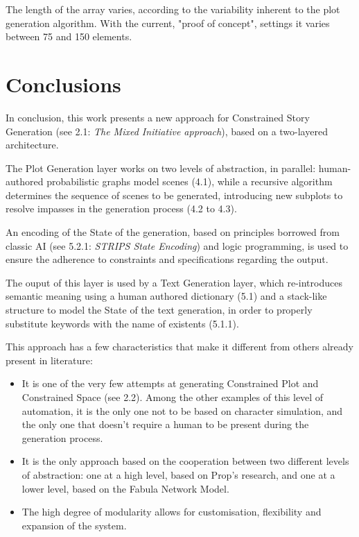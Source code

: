 \documentclass[12pt,a4paper,oneside]{report}
\begin{document}
The length of the array varies, according to the variability inherent to the plot generation algorithm. With the current, "proof of concept", settings it varies between 75 and 150 elements.

\pagebreak

\chapter{Conclusions}
In conclusion, this work presents a new approach for Constrained Story Generation (see 2.1: \textit{The Mixed Initiative approach}), based on a two-layered architecture.

The Plot Generation layer works on two levels of abstraction, in parallel: human-authored probabilistic graphs model scenes (4.1), while a recursive algorithm determines the sequence of scenes to be generated, introducing new subplots to resolve impasses in the generation process (4.2 to 4.3).

An encoding of the State of the generation, based on principles borrowed from classic AI (see 5.2.1: \textit{STRIPS State Encoding}) and logic programming, is used to ensure the adherence to constraints and specifications regarding the output.

\bigskip

The ouput of this layer is used by a Text Generation layer, which re-introduces semantic meaning using a human authored dictionary (5.1) and a stack-like structure to model the State of the text generation, in order to properly substitute keywords with the name of existents (5.1.1).

\bigskip

This approach has a few characteristics that make it different from others already present in literature:

\begin{itemize}\setlength{\itemsep}{0pt}
\item It is one of the very few attempts at generating Constrained Plot and Constrained Space (see 2.2). Among the other examples of this level of automation, it is the only one not to be based on character simulation, and the only one that doesn't require a human to be present during the generation process.
\item It is the only approach based on the cooperation between two different levels of abstraction: one at a high level, based on Prop's research, and one at a lower level, based on the Fabula Network Model.
\item The high degree of modularity allows for customisation, flexibility and expansion of the system.
\end{itemize}
\end{document}

